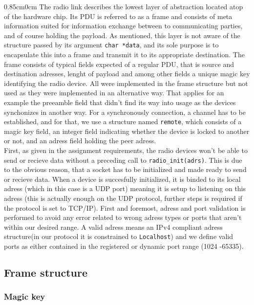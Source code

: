 \documentclass{article}
\newcommand{\code}[1]{\texttt{#1}}
\newcommand{\tWidth}{0.85cm}
\newcommand{\iPar}[1]{\begin{adjustwidth}{\tWidth}{0cm} #1 \end{adjustwidth}
}
\begin{document}
	\iPar{
		The radio link describes the lowest layer of abstraction located atop of the hardware chip. Its PDU is referred to as a frame and consists of meta information suited for information exchange between to communicating parties, and of course holding the payload. As mentioned, this layer is not aware of the structure passed by its argument \code{char *data}, and its sole purpose is to encapsulate this into a frame and transmit it to its appropriate destination. The frame consists of typical fields expected of a regular PDU, that is source and destination adresses, lenght of payload and among other fields a unique magic key identifying the radio device. All were implemented in the frame structure but not used as they were implemented in an alternative way. That applies for an example the preeamble field that didn't find its way into usage as the devices synchonizes in another way. For a synchronously connection, a channel has to be established, and for that, we use a structure named \code{remote}, which consists of a magic key field, an integer field indicating whether the device is locked to another or not, and an adress field holding the peer adress. \\
		
		First, as given in the assignment requirements, the radio devices won't be able to send or recieve data without a preceding call to \code{radio\_init(adrs)}. This is due to the obvious reason, that a socket has to be initialized and made ready to send or recieve data. When a device is succesfully initialized, it is binded to its local adress (which in this case is a UDP port) meaning it is setup to listening on this adress (this is actually enough on the UDP protocol, further steps is required if the protocol is set to TCP/IP). First and foremost, adress and port validation is performed to avoid any error related to wrong adress types or ports that aren't within our desired range. A valid adress means an IPv4 compliant adress structure(in our protocol it is constrained to \code{Localhost}) and we define valid ports as either contained in the registered or dynamic port range (1024 -65335). 
		}
	
	\subsection{Frame structure}
	
	\subsubsection{Magic key}
	
\end{document}
